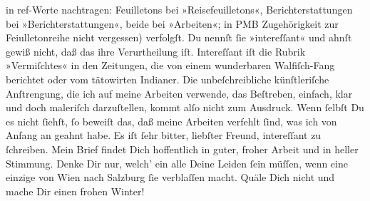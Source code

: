 \begin{ledgroupsized}[t]{13cm}
{{{                  in ref-Werte nachtragen: Feuilletons bei »Reisefeuilletons«, Berichterstattungen
                  bei »Berichterstattungen«, beide bei »Arbeiten«; in PMB Zugehörigkeit zur
                  Feiulletonreihe nicht vergessen)}}}\label{K_L02858-4h} verfolgſt. Du nennſt ſie »intereſſant« und
               ahnſt gewiß nicht, daß das ihre Verurtheilung iſt. Intereſſant iſt die Rubrik
               »Vermiſchtes« in den Zeitungen, die von einem wunderbaren Walfiſch-Fang berichtet
               oder vom tätowirten Indianer. Die unbeſchreibliche künſtleriſche Anſtrengung, die ich
               auf meine Arbeiten verwende, das Beſtreben, einfach, klar und doch maleriſch
               darzuſtellen, {\pb}kommt alſo nicht zum Ausdruck. Wenn
               ſelbſt Du es nicht ſiehſt, ſo beweiſt das, daß meine Arbeiten verfehlt ſind, was ich
               von Anfang an \strikeout{\textcolor{gray}{×}\-\textcolor{gray}{×}\-\textcolor{gray}{×}\-\textcolor{gray}{×}\-\textcolor{gray}{×}\-\textcolor{gray}{×}\-\textcolor{gray}{×}} geahnt habe. Es iſt ſehr bitter, liebſter Freund, intereſſant zu
               ſchreiben.\pend
           \pstart
           Mein Brief findet Dich hoffentlich in guter, froher Arbeit und in heller Stimmung.
               Denke Dir nur, welch’ ein \label{K_L02858-6v}\label{K_L02858-6h}{ } alle Deine Leiden ſein müſſen, {\pb}wenn eine einzige \label{K_L02858-8v}\label{K_L02858-8h} von Wien nach Salzburg ſie verblaſſen macht. Quäle Dich nicht und mache Dir
               einen frohen Winter!\pend
           \pstart

\end{ledgroupsized}
